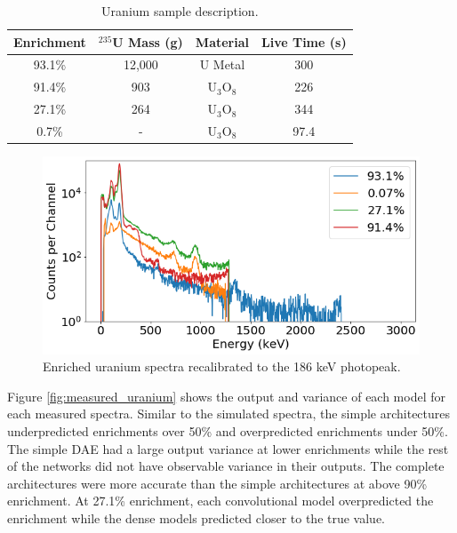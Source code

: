 \begin{table}[H]
\centering
\caption{Uranium sample description.}
\label{table:default_sim_params_uranium}
\begin{tabular}{cccc}
Enrichment & $^{235}$U Mass (g) & Material & Live Time (s)   \\ \hline
93.1\% & 12,000 & U Metal & 300 \\
91.4\% & 903 & U$_{3}$O$_{8}$ &  226\\
27.1\%  & 264 & U$_{3}$O$_{8}$ & 344 \\ 
0.7\% & - & U$_{3}$O$_{8}$ & 97.4 \\
\end{tabular}
\end{table}

\begin{figure}[H]
	\centering
	\includegraphics[width=0.8\linewidth]{images/measured_uranium_plots.png}
	\caption{Enriched uranium spectra recalibrated to the 186 keV photopeak.}
	\label{fig:measured_uranium_plots}
\end{figure}

Figure \ref{fig:measured_uranium} shows the output and variance of each model for each measured spectra. Similar to the simulated spectra, the simple architectures underpredicted enrichments over 50\% and overpredicted enrichments under 50\%. The simple DAE had a large output variance at lower enrichments while the rest of the networks did not have observable variance in their outputs. The complete architectures were more accurate than the simple architectures at above 90\% enrichment. At 27.1\% enrichment, each convolutional model overpredicted the enrichment while the dense models predicted closer to the true value. %



